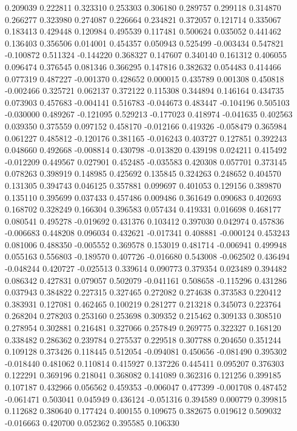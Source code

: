 0.209039
0.222811
0.323310
0.253303
0.306180
0.289757
0.299118
0.314870
0.266277
0.323980
0.274087
0.226664
0.234821
0.372057
0.121714
0.335067
0.183413
0.429448
0.120984
0.495539
0.117481
0.500624
0.035052
0.441462
0.136403
0.356506
0.014001
0.454357
0.050943
0.525499
-0.003434
0.547821
-0.100872
0.511324
-0.144220
0.368327
0.147607
0.340140
0.161312
0.406055
0.096474
0.376545
0.081346
0.366295
0.147816
0.382632
0.054483
0.414466
0.077319
0.487227
-0.001370
0.428652
0.000015
0.435789
0.001308
0.450818
-0.002466
0.325721
0.062137
0.372122
0.115308
0.344894
0.146164
0.434735
0.073903
0.457683
-0.004141
0.516783
-0.044673
0.483447
-0.104196
0.505103
-0.030000
0.489267
-0.121095
0.529213
-0.177023
0.418974
-0.041635
0.402563
0.039350
0.375559
0.097152
0.458170
-0.012166
0.419326
-0.058479
0.365984
0.061227
0.485812
-0.120176
0.381165
-0.016243
0.403727
0.127851
0.392243
0.048660
0.492668
-0.008814
0.430798
-0.013820
0.439198
0.024211
0.415492
-0.012209
0.449567
0.027901
0.452485
-0.035583
0.420308
0.057701
0.373145
0.078263
0.398919
0.148985
0.425692
0.135845
0.324263
0.248652
0.404570
0.131305
0.394743
0.046125
0.357881
0.099697
0.401053
0.129156
0.389870
0.135110
0.395699
0.037433
0.457486
0.009486
0.361649
0.090683
0.402693
0.168702
0.328249
0.166304
0.396583
0.057434
0.419331
0.016698
0.468177
0.080541
0.495278
-0.019692
0.431376
0.103412
0.397030
0.042974
0.457836
-0.006683
0.448208
0.096034
0.432621
-0.017341
0.408881
-0.000124
0.453243
0.081006
0.488350
-0.005552
0.369578
0.153019
0.481714
-0.006941
0.499948
0.055163
0.556803
-0.189570
0.407726
-0.016680
0.543008
-0.062502
0.436494
-0.048244
0.420727
-0.025513
0.339614
0.090773
0.379354
0.023489
0.394482
0.086342
0.427831
0.079057
0.502079
-0.041161
0.508658
-0.115296
0.431286
0.037943
0.384822
0.227315
0.327465
0.272082
0.274638
0.373583
0.220412
0.383931
0.127081
0.462465
0.100219
0.281277
0.213218
0.345073
0.223764
0.268204
0.278203
0.253160
0.253698
0.309352
0.215462
0.309133
0.308510
0.278954
0.302881
0.216481
0.327066
0.257849
0.269775
0.322327
0.168120
0.338482
0.286362
0.239784
0.275537
0.229518
0.307788
0.204650
0.351244
0.109128
0.373426
0.118445
0.512054
-0.094081
0.450656
-0.081490
0.395302
-0.018440
0.481062
0.110814
0.415927
0.137226
0.445411
0.095207
0.376303
0.122291
0.369196
0.218041
0.368082
0.141089
0.362316
0.121256
0.399185
0.107187
0.432966
0.056562
0.459353
-0.006047
0.477399
-0.001708
0.487452
-0.061471
0.503041
0.045949
0.436124
-0.051316
0.394589
0.000779
0.399815
0.112682
0.380640
0.177424
0.400155
0.109675
0.382675
0.019612
0.509032
-0.016663
0.420700
0.052362
0.395585
0.106330
